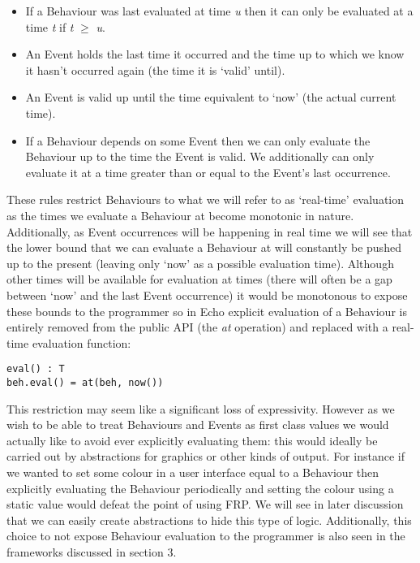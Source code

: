     \begin{itemize}
      \item If a Behaviour was last evaluated at time \emph{u} then it can only be evaluated at
      a time \emph{t} if \emph{t} $\geq$ \emph{u}.
      \item An Event holds the last time it occurred and the time up to which we know it hasn't occurred
      again (the time it is `valid' until).
      \item An Event is valid up until the time equivalent to `now' (the actual current time).
      \item If a Behaviour depends on some Event then we can only evaluate the Behaviour up to
      the time the Event is valid. We additionally can only evaluate it at a time greater than
      or equal to the Event's last occurrence.
    \end{itemize}
    
    These rules restrict Behaviours to what we will refer to as `real-time' evaluation as the times
    we evaluate a Behaviour at become monotonic in nature. Additionally, as Event occurrences will
    be happening in real time we will see that the lower bound that we can evaluate a Behaviour at will
    constantly be pushed up to the present (leaving only `now' as a possible evaluation time). Although
    other times will be available for evaluation at times (there will often be a gap between `now' and
    the last Event occurrence) it would be monotonous to expose these bounds to the programmer so
    in Echo explicit evaluation of a Behaviour is entirely removed from the public API (the
    \emph{at} operation) and replaced with a real-time evaluation function:

\begin{verbatim}
eval() : T
beh.eval() = at(beh, now())
\end{verbatim}  

    This restriction may seem like a significant loss of expressivity. However as we wish to be able to treat
    Behaviours and Events as first class values we would actually like to avoid ever explicitly evaluating
    them: this would ideally be carried out by abstractions for graphics or other kinds of output. For instance
    if we wanted to set some colour in a user interface equal to a Behaviour then explicitly evaluating the Behaviour
    periodically and setting the colour using a static value would defeat the point of using FRP. We will see in later
    discussion that we can easily create abstractions to hide this type of logic. Additionally, this
    choice to not expose Behaviour evaluation to the programmer is also seen in the frameworks
    discussed in section 3.
    
